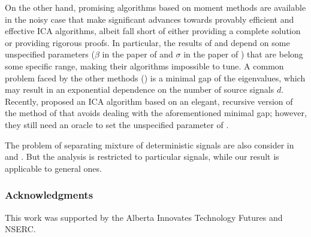 \documentclass{article} %
\theoremstyle{definition}
\begin{document}
On the other hand, promising algorithms based on moment methods are available in the noisy case that make significant advances towards provably efficient and effective ICA algorithms, albeit fall short of either providing a complete solution or providing rigorous proofs. \citep{anandkumar2012tensordecomposition,anandkumar2012method, arora2012provable, hsu2013learning, goyal2014fourier}
In particular, the results of \citep{arora2012provable} and \cite{goyal2014fourier} depend on some  unspecified parameters ($\beta$ in the paper of \citep{arora2012provable} and $\sigma$ in the paper of \citep{goyal2014fourier}) that are belong some specific range, making their algorithms impossible to tune.
A common problem faced by the other methods (\citep{anandkumar2012tensordecomposition,anandkumar2012method,hsu2013learning}) is a minimal gap of the eigenvalues, which may result in an exponential dependence on the number of source signals $d$. 
Recently, \citet{vempala2014max} proposed an ICA algorithm based on an elegant, recursive version of the method of \citet{goyal2014fourier} that avoids dealing with the aforementioned minimal gap; however, they still need an oracle to set the unspecified parameter of \citet{goyal2014fourier}.

The problem of separating mixture of deterministic signals are also consider in \citep{kirimoto2011separation} and \citep{forootan2013separation}. But the analysis is restricted to particular signals, while our result is applicable to general ones.

\subsubsection*{Acknowledgments}
This work was supported by the Alberta Innovates Technology Futures and NSERC.


\end{document}
